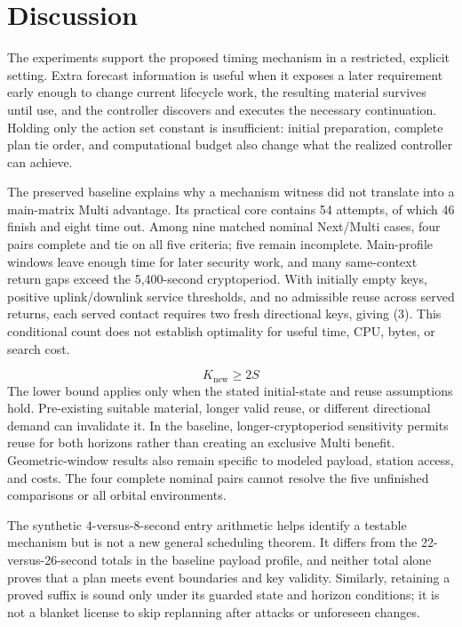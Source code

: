 \documentclass[12pt,a4paper]{article}
\begin{document}
\section*{Discussion}
The experiments support the proposed timing mechanism in a restricted, explicit setting. Extra forecast information is useful when it exposes a later requirement early enough to change current lifecycle work, the resulting material survives until use, and the controller discovers and executes the necessary continuation. Holding only the action set constant is insufficient: initial preparation, complete plan tie order, and computational budget also change what the realized controller can achieve.

The preserved baseline explains why a mechanism witness did not translate into a main-matrix Multi advantage. Its practical core contains 54 attempts, of which 46 finish and eight time out. Among nine matched nominal Next/Multi cases, four pairs complete and tie on all five criteria; five remain incomplete. Main-profile windows leave enough time for later security work, and many same-context return gaps exceed the 5,400-second cryptoperiod. With initially empty keys, positive uplink/downlink service thresholds, and no admissible reuse across served returns, each served contact requires two fresh directional keys, giving (3). This conditional count does not establish optimality for useful time, CPU, bytes, or search cost.

\begin{equation}K_{\mathrm{new}}\geq 2S\tag{3}\end{equation}
The lower bound applies only when the stated initial-state and reuse assumptions hold. Pre-existing suitable material, longer valid reuse, or different directional demand can invalidate it. In the baseline, longer-cryptoperiod sensitivity permits reuse for both horizons rather than creating an exclusive Multi benefit. Geometric-window results also remain specific to modeled payload, station access, and costs. The four complete nominal pairs cannot resolve the five unfinished comparisons or all orbital environments.

The synthetic 4-versus-8-second entry arithmetic helps identify a testable mechanism but is not a new general scheduling theorem. It differs from the 22-versus-26-second totals in the baseline payload profile, and neither total alone proves that a plan meets event boundaries and key validity. Similarly, retaining a proved suffix is sound only under its guarded state and horizon conditions; it is not a blanket license to skip replanning after attacks or unforeseen changes.
\end{document}
